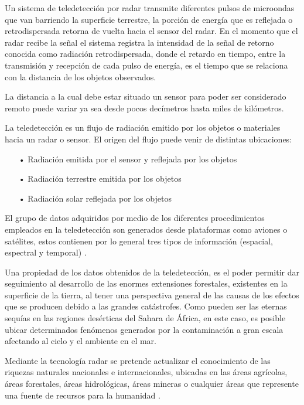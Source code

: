 Un sistema de teledetección por radar transmite diferentes pulsos de microondas que van barriendo la superficie terrestre, la porción de energía que es reflejada o retrodispersada retorna de vuelta hacia el sensor del radar. En el momento que el radar recibe la señal el sistema registra la intensidad de la señal de retorno conocida como radiación retrodispersada, donde el retardo en tiempo, entre la transmisión y recepción de cada pulso de energía, es el tiempo que se relaciona con la distancia de los objetos observados.

La distancia a la cual debe estar situado un sensor para poder ser considerado remoto puede variar ya sea desde pocos decímetros hasta miles de kilómetros.

La teledetección es un flujo de radiación emitido por los objetos o materiales hacia un radar o sensor. El origen del flujo puede venir de distintas ubicaciones:

\begin{itemize}
\item[•] Radiación emitida por el sensor y reflejada por los objetos

\item[•] Radiación terrestre emitida por los objetos 

\item[•] Radiación solar reflejada por los objetos 
\end{itemize}

El grupo de datos adquiridos por medio de los diferentes procedimientos empleados en la teledetección son generados desde plataformas como aviones o satélites, estos contienen por lo general tres tipos de información (espacial, espectral y temporal) \cite{SacristanRomero}.

Una propiedad de los datos obtenidos de la teledetección, es el poder permitir dar seguimiento al desarrollo de las enormes extensiones forestales, existentes en la superficie de la tierra, al tener una perspectiva general de las causas de los efectos que se producen debido a las grandes catástrofes. Como pueden ser las eternas sequías en las regiones desérticas del Sahara de África, en este caso, es posible ubicar determinados fenómenos generados por la contaminación a gran escala afectando al cielo y el ambiente en el mar.

Mediante la tecnología radar se pretende actualizar el conocimiento de las riquezas naturales nacionales e internacionales, ubicadas en las áreas agrícolas, áreas forestales, áreas hidrológicas, áreas mineras o cualquier áreas que represente una fuente de recursos para la humanidad \cite{Romero2007}.

